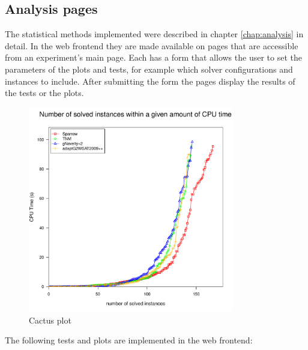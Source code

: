 \subsection{Analysis pages}
The statistical methods implemented were described in chapter \ref{chap:analysis} in detail. In the web frontend they are made available on pages that are accessible from an experiment's main page. Each has a form that allows the user to set the parameters of the plots and tests, for example which solver configurations and instances to include. After submitting the form the pages display the results of the tests or the plots.
\begin{figure}
\centering
\includegraphics[width=9cm]{SAT_Competition_scenario_cactus}
\caption{Cactus plot}
\label{fig:cactus}
\end{figure}
The following tests and plots are implemented in the web frontend:
